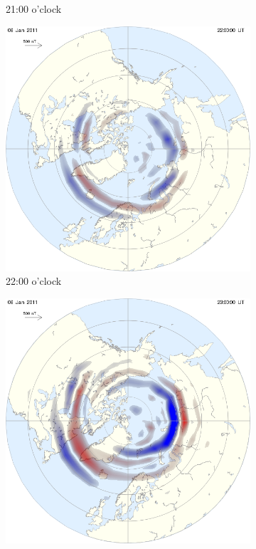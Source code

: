 \documentclass[10pt,a4paper]{article}
\begin{document}
\begin{figure}[h]
\begin{subfigure}{0.3\textwidth}
	\caption{ 21:00 o'clock \label{amp21}}
\end{subfigure}
\begin{subfigure}{0.3\textwidth}
\centering
	\includegraphics[width=\textwidth]{ampere4.png}
	\caption{ 22:00 o'clock \label{amp22}}
\end{subfigure}
\begin{subfigure}{0.3\textwidth}
\centering
	\includegraphics[width=\textwidth]{ampere5.png}

\end{subfigure}
\end{figure}
\end{document}
